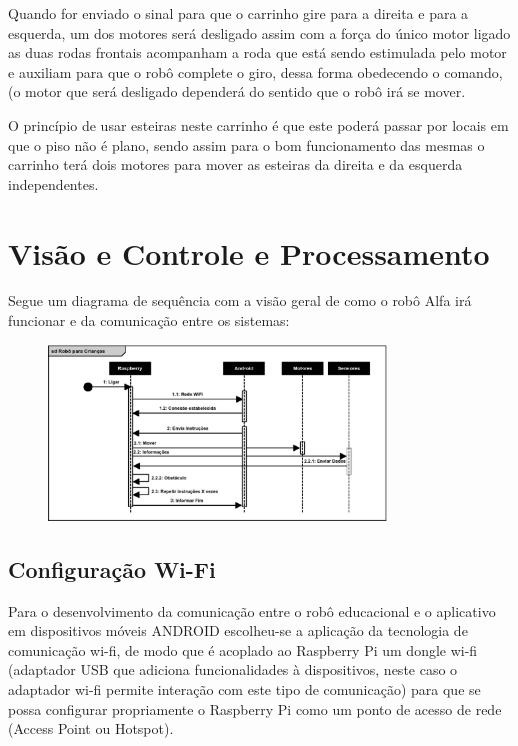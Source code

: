 Quando for enviado o sinal para que o carrinho gire para a direita e para a esquerda, um dos motores será desligado assim com a força do único motor ligado as duas rodas frontais acompanham a roda que está sendo estimulada pelo motor e auxiliam para que o robô complete o giro, dessa forma obedecendo o comando, (o motor que será desligado dependerá do sentido que o robô irá se mover.
 
O princípio de usar esteiras neste carrinho é que este poderá passar por locais em que o piso não é plano, sendo assim para o bom funcionamento das mesmas o carrinho terá dois motores  para mover as esteiras da direita e da esquerda independentes. 

\section{Visão e Controle e Processamento}

Segue um diagrama de sequência com a visão geral de como o robô Alfa irá funcionar e da comunicação entre os sistemas:

\begin{figure}[H]
    \centering
    \includegraphics[width=0.8\textwidth]{figuras/diagrama_de_sequencia.eps}
    \caption{}
    \label{fig:catia01}
\end{figure}

\subsection{Configuração Wi-Fi}

Para o desenvolvimento da comunicação entre o robô educacional e o aplicativo em dispositivos móveis ANDROID escolheu-se a aplicação da tecnologia de comunicação wi-fi, de modo que é acoplado ao Raspberry Pi um dongle wi-fi (adaptador USB que adiciona funcionalidades à dispositivos, neste caso o adaptador wi-fi permite interação com este tipo de comunicação) para que se possa configurar propriamente o Raspberry Pi como um ponto de acesso de rede (Access Point ou Hotspot).

